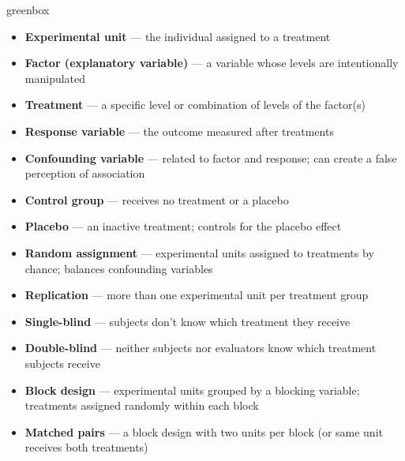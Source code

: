 \documentclass[10pt]{article}
\begin{document}
\begin{skillbox}{greenbox}
\begin{minipage}[t]{0.48\linewidth}
    \begin{itemize}
        \item \textbf{Experimental unit} --- the individual assigned to a treatment
        \item \textbf{Factor (explanatory variable)} --- a variable whose levels are
              intentionally manipulated
        \item \textbf{Treatment} --- a specific level or combination of levels of the
              factor(s)
        \item \textbf{Response variable} --- the outcome measured after treatments
        \item \textbf{Confounding variable} --- related to factor and response; can
              create a false perception of association
        \item \textbf{Control group} --- receives no treatment or a placebo
        \item \textbf{Placebo} --- an inactive treatment; controls for the placebo effect
    \end{itemize}
\end{minipage}
\hfill
\begin{minipage}[t]{0.48\linewidth}
    \begin{itemize}
        \item \textbf{Random assignment} --- experimental units assigned to treatments
              by chance; balances confounding variables
        \item \textbf{Replication} --- more than one experimental unit per treatment group
        \item \textbf{Single-blind} --- subjects don't know which treatment they receive
        \item \textbf{Double-blind} --- neither subjects nor evaluators know which
              treatment subjects receive
        \item \textbf{Block design} --- experimental units grouped by a blocking
              variable; treatments assigned randomly within each block
        \item \textbf{Matched pairs} --- a block design with two units per block (or
              same unit receives both treatments)
    \end{itemize}
\end{minipage}
\end{skillbox}
\end{document}
